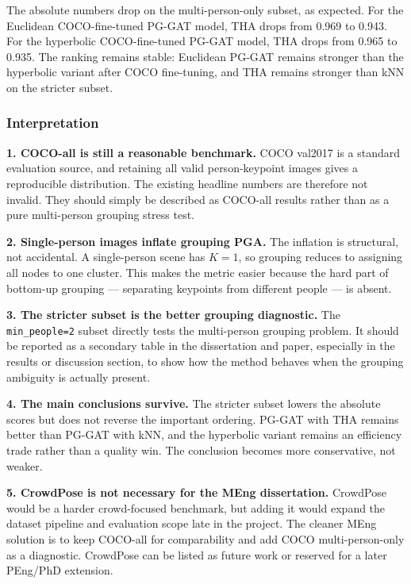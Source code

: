 \vspace{0.5em}

The absolute numbers drop on the multi-person-only subset, as expected.
For the Euclidean COCO-fine-tuned PG-GAT model, THA drops from 0.969 to 0.943.
For the hyperbolic COCO-fine-tuned PG-GAT model, THA drops from 0.965 to 0.935.
The ranking remains stable: Euclidean PG-GAT remains stronger than the hyperbolic variant after COCO fine-tuning, and THA remains stronger than kNN on the stricter subset.

\subsubsection{Interpretation}

\textbf{1. COCO-all is still a reasonable benchmark.} COCO val2017 is a standard evaluation source, and retaining all valid person-keypoint images gives a reproducible distribution. The existing headline numbers are therefore not invalid. They should simply be described as COCO-all results rather than as a pure multi-person grouping stress test.

\textbf{2. Single-person images inflate grouping PGA.} The inflation is structural, not accidental. A single-person scene has $K=1$, so grouping reduces to assigning all nodes to one cluster. This makes the metric easier because the hard part of bottom-up grouping --- separating keypoints from different people --- is absent.

\textbf{3. The stricter subset is the better grouping diagnostic.} The \texttt{min\_people=2} subset directly tests the multi-person grouping problem. It should be reported as a secondary table in the dissertation and paper, especially in the results or discussion section, to show how the method behaves when the grouping ambiguity is actually present.

\textbf{4. The main conclusions survive.} The stricter subset lowers the absolute scores but does not reverse the important ordering. PG-GAT with THA remains better than PG-GAT with kNN, and the hyperbolic variant remains an efficiency trade rather than a quality win. The conclusion becomes more conservative, not weaker.

\textbf{5. CrowdPose is not necessary for the MEng dissertation.} CrowdPose would be a harder crowd-focused benchmark, but adding it would expand the dataset pipeline and evaluation scope late in the project. The cleaner MEng solution is to keep COCO-all for comparability and add COCO multi-person-only as a diagnostic. CrowdPose can be listed as future work or reserved for a later PEng/PhD extension.

